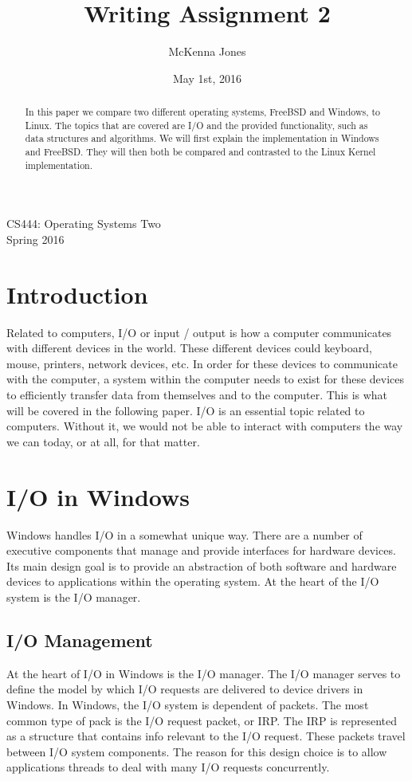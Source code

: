 \documentclass[letterpaper,10pt,titlepage,draftclsnofoot,onecolumn]{IEEEtran}
\title{Writing Assignment 2}
\author{McKenna Jones}
\date{May 1st, 2016}
\begin{document}
\begin{titlepage}
\maketitle
\begin{center}
CS444: Operating Systems Two \\
Spring 2016
\vspace{50 mm}
\end{center}
\begin{abstract}
In this paper we compare two different operating systems, FreeBSD and Windows, to Linux. The topics that are covered are I/O and the provided functionality, such as data structures and algorithms. We will first explain the implementation in Windows and FreeBSD. They will then both be compared and contrasted to the Linux Kernel implementation.
\end{abstract}
\end{titlepage}
\section{Introduction}
Related to computers, I/O or input / output is how a computer communicates with different devices in the world. These different devices could keyboard, mouse, printers, network devices, etc. In order for these devices to communicate with the computer, a system within the computer needs to exist for these devices to efficiently transfer data from themselves and to the computer. This is what will be covered in the following paper. I/O is an essential topic related to computers. Without it, we would not be able to interact with computers the way we can today, or at all, for that matter.

\section{I/O in Windows}
Windows handles I/O in a somewhat unique way. There are a number of executive components that manage and provide interfaces for hardware devices. Its main design goal is to provide an abstraction of both software and hardware devices to applications within the operating system. At the heart of the I/O system is the I/O manager. 

\subsection{I/O Management}
At the heart of I/O in Windows is the I/O manager. The I/O manager serves to define the model by which I/O requests are delivered to device drivers in Windows. In Windows, the I/O system is dependent of packets. The most common type of pack is the I/O request packet, or IRP. The IRP is represented as a structure that contains info relevant to the I/O request. These packets travel between I/O system components. \cite{windows} The reason for this design choice is to allow applications threads to deal with many I/O requests concurrently.  
\end{document}

